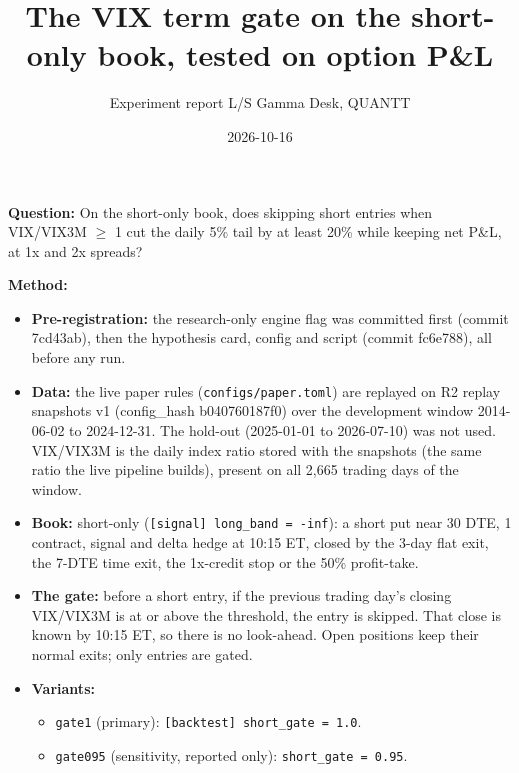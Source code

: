 \documentclass{article}
\title{The VIX term gate on the short-only book, tested on option P\&L}
\author{Experiment report \textperiodcentered{} L/S Gamma Desk, QUANTT}
\date{2026-10-16}
\begin{document}
\maketitle

\textbf{Question:} On the short-only book, does skipping short entries when VIX/\allowbreak{}VIX3M \ensuremath{\geq} 1 cut the daily 5\% tail by at least 20\% while keeping net P\&L, at 1x and 2x spreads?

\textbf{Method:}

\begin{itemize}

\item \textbf{Pre-registration:} the research-only engine flag was committed first (commit 7cd43ab), then the hypothesis card, config and script (commit fc6e788), all before any run.

\item \textbf{Data:} the live paper rules (\texttt{configs/\allowbreak{}paper.\allowbreak{}toml}) are replayed on R2 replay snapshots v1 (config\_hash b040760187f0) over the development window 2014-06-02 to 2024-12-31. The hold-out (2025-01-01 to 2026-07-10) was not used. VIX/\allowbreak{}VIX3M is the daily index ratio stored with the snapshots (the same ratio the live pipeline builds), present on all 2,665 trading days of the window.

\item \textbf{Book:} short-only (\texttt{[signal] long\_\allowbreak{}band = -\allowbreak{}inf}): a short put near 30 DTE, 1 contract, signal and delta hedge at 10:15 ET, closed by the 3-day flat exit, the 7-DTE time exit, the 1x-credit stop or the 50\% profit-take.

\item \textbf{The gate:} before a short entry, if the previous trading day's closing VIX/\allowbreak{}VIX3M is at or above the threshold, the entry is skipped. That close is known by 10:15 ET, so there is no look-ahead. Open positions keep their normal exits; only entries are gated.

\item \textbf{Variants:}

\begin{itemize}

\item \texttt{gate1} (primary): \texttt{[backtest] short\_\allowbreak{}gate = 1.\allowbreak{}0}.

\item \texttt{gate095} (sensitivity, reported only): \texttt{short\_\allowbreak{}gate = 0.\allowbreak{}95}.


\end{itemize}
\end{itemize}
\end{document}
